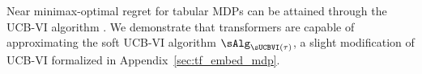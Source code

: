 \documentclass[10pt]{article}
\begin{document}
Near minimax-optimal regret for tabular MDPs can be attained through the UCB-VI algorithm \citep{azar2017minimax}. We demonstrate that transformers are capable of approximating the soft UCB-VI algorithm $\sAlg_{\sUCBVI(\tau)}$, a slight modification of UCB-VI formalized in Appendix~\ref{sec:tf_embed_mdp}. 


\end{document}
